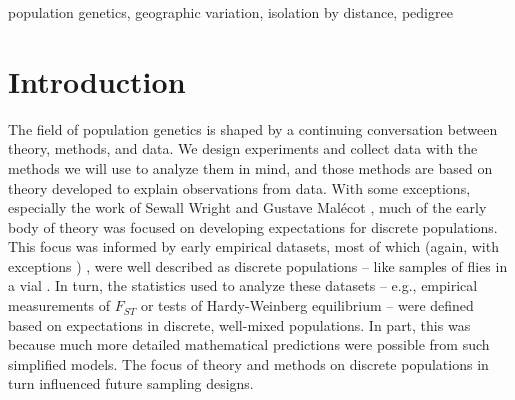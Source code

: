 \documentclass{ar-1col}
\newcommand{\g}[1]{{\color{blue}{#1}}}
\begin{document}
\ifsubmissionversion
\begin{keywords}
population genetics, geographic variation, isolation by distance, pedigree
\end{keywords}
\maketitle
\else
\newpage
\fi

\tableofcontents

\ifsubmissionversion
\else
	\newpage
\fi

\section{Introduction}

The field of population genetics is shaped by a continuing conversation
between theory, methods, and data.
We design experiments and collect data
with the methods we will use to analyze them in mind, 
and those methods are based on theory
developed to explain observations from data.
With some exceptions,
especially the work of Sewall Wright \citeyearpar{Wright1940,Wright1943,wright1946isolation}
and Gustave Mal\'ecot \citeyearpar{malecot},
much of the early body of theory was focused on
developing expectations for discrete populations.
This focus was informed by early empirical datasets,
most of which
(again, with exceptions \citep[e.g.,][]{Dobzhansky_Wright1943, dobzhansky1947}) \g{fisher, haldane?},
were well described as discrete populations --
like samples of flies in a vial \citep{lewontin1974}.
In turn, 
the statistics used to analyze these datasets --
e.g., empirical measurements of $F_{ST}$ \citep{Wright1951}
or tests of Hardy-Weinberg equilibrium \citep{hardy1908,weinberg1908} --
were defined based on expectations in discrete, well-mixed populations.
In part, this was because much more detailed mathematical predictions 
were possible from such simplified models.
The focus of theory and methods on discrete populations in turn influenced
future sampling designs.
\end{document}
